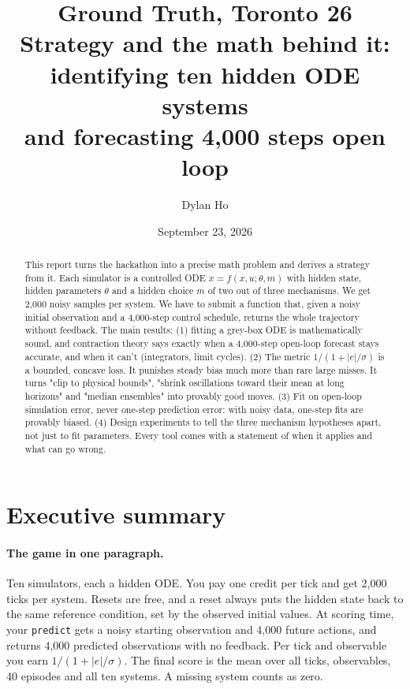 \documentclass[11pt]{article}
\title{\textbf{Ground Truth, Toronto 26}\\[4pt]\large Strategy and the math behind it: identifying ten hidden ODE systems\\ and forecasting 4,000 steps open loop}
\author{Dylan Ho}
\date{September 23, 2026}
\theoremstyle{plain}
\theoremstyle{definition}
\theoremstyle{remark}
\begin{document}
\maketitle

\begin{abstract}
\noindent This report turns the hackathon into a precise math problem and derives a strategy from it. Each simulator is a controlled ODE $\dot x = f(x,u;\theta,m)$ with hidden state, hidden parameters $\theta$ and a hidden choice $m$ of two out of three mechanisms. We get 2,000 noisy samples per system. We have to submit a function that, given a noisy initial observation and a 4,000-step control schedule, returns the whole trajectory without feedback. The main results: (1) fitting a grey-box ODE is mathematically sound, and contraction theory says exactly when a 4,000-step open-loop forecast stays accurate, and when it can't (integrators, limit cycles). (2) The metric $1/(1+|e|/\sigma)$ is a bounded, concave loss. It punishes steady bias much more than rare large misses. It turns "clip to physical bounds", "shrink oscillations toward their mean at long horizons" and "median ensembles" into provably good moves. (3) Fit on open-loop simulation error, never one-step prediction error: with noisy data, one-step fits are provably biased. (4) Design experiments to tell the three mechanism hypotheses apart, not just to fit parameters. Every tool comes with a statement of when it applies and what can go wrong.
\end{abstract}

\tableofcontents
\newpage

\section{Executive summary}

\paragraph{The game in one paragraph.} Ten simulators, each a hidden ODE. You pay one credit per tick and get 2,000 ticks per system. Resets are free, and a reset always puts the hidden state back to the same reference condition, set by the observed initial values. At scoring time, your \texttt{predict} gets a noisy starting observation and 4,000 future actions, and returns 4,000 predicted observations with no feedback. Per tick and observable you earn $1/(1+|e|/\sigma)$. The final score is the mean over all ticks, observables, 40 episodes and all ten systems. A missing system counts as zero.
\end{document}
